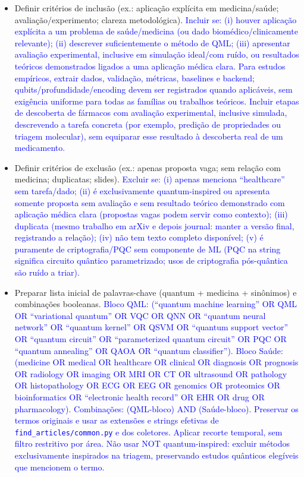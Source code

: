 \documentclass[11pt]{article}
\begin{document}
\begin{itemize}
  \item [ ] Definir critérios de inclusão (ex.: aplicação explícita em medicina/saúde; avaliação/experimento; clareza metodológica). \textcolor{blue}{Incluir se: (i) houver aplicação explícita a um problema de saúde/medicina (ou dado biomédico/clinicamente relevante); (ii) descrever suficientemente o método de QML; (iii) apresentar avaliação experimental, inclusive em simulação ideal/com ruído, ou resultados teóricos demonstrados ligados a uma aplicação médica clara. Para estudos empíricos, extrair dados, validação, métricas, baselines e backend; qubits/profundidade/encoding devem ser registrados quando aplicáveis, sem exigência uniforme para todas as famílias ou trabalhos teóricos. Incluir etapas de descoberta de fármacos com avaliação experimental, inclusive simulada, descrevendo a tarefa concreta (por exemplo, predição de propriedades ou triagem molecular), sem equiparar esse resultado à descoberta real de um medicamento.}
  \item [ ] Definir critérios de exclusão (ex.: apenas proposta vaga; sem relação com medicina; duplicatas; slides). \textcolor{blue}{Excluir se: (i) apenas menciona ``healthcare'' sem tarefa/dado; (ii) é exclusivamente quantum-inspired ou apresenta somente proposta sem avaliação e sem resultado teórico demonstrado com aplicação médica clara (propostas vagas podem servir como contexto); (iii) duplicata (mesmo trabalho em arXiv e depois journal: manter a versão final, registrando a relação); (iv) não tem texto completo disponível; (v) é puramente de criptografia/PQC sem componente de ML (PQC na string significa circuito quântico parametrizado; usos de criptografia pós-quântica são ruído a triar).}
  \item [ ] Preparar lista inicial de palavras-chave (quantum + medicina + sinônimos) e combinações booleanas. \textcolor{blue}{Bloco QML: (``quantum machine learning'' OR QML OR ``variational quantum'' OR VQC OR QNN OR ``quantum neural network'' OR ``quantum kernel'' OR QSVM OR ``quantum support vector'' OR ``quantum circuit'' OR ``parameterized quantum circuit'' OR PQC OR ``quantum annealing'' OR QAOA OR ``quantum classifier''). Bloco Saúde: (medicine OR medical OR healthcare OR clinical OR diagnosis OR prognosis OR radiology OR imaging OR MRI OR CT OR ultrasound OR pathology OR histopathology OR ECG OR EEG OR genomics OR proteomics OR bioinformatics OR ``electronic health record'' OR EHR OR drug OR pharmacology). Combinações: (QML-bloco) AND (Saúde-bloco). Preservar os termos originais e usar as extensões e strings efetivas de \texttt{find\_articles/common.py} e dos coletores. Aplicar recorte temporal, sem filtro restritivo por área. Não usar NOT quantum-inspired: excluir métodos exclusivamente inspirados na triagem, preservando estudos quânticos elegíveis que mencionem o termo.}

\end{itemize}
\end{document}

